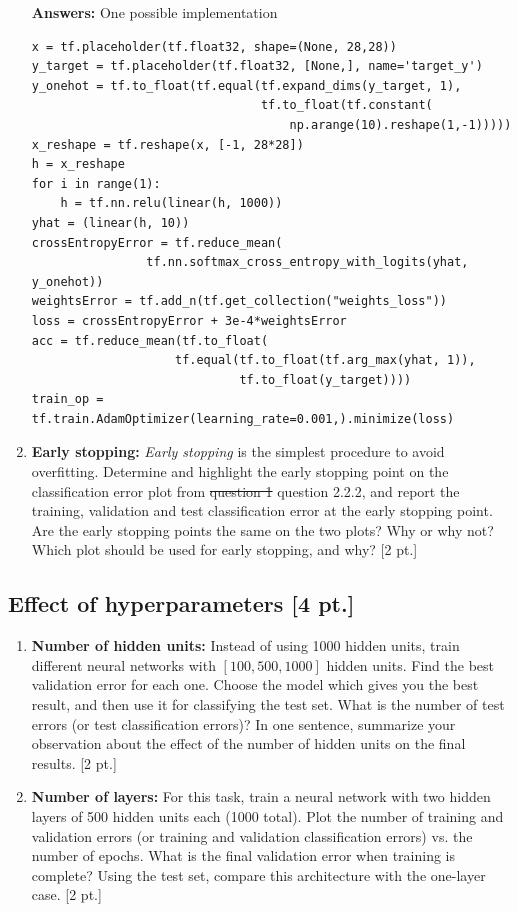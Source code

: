 \documentclass[12pt,letterpaper]{article}
\begin{document}
\begin{enumerate}
{\color{red}
  \textbf{Answers:}
  One possible implementation
}
\begin{verbatim}
x = tf.placeholder(tf.float32, shape=(None, 28,28))
y_target = tf.placeholder(tf.float32, [None,], name='target_y')
y_onehot = tf.to_float(tf.equal(tf.expand_dims(y_target, 1),
                                tf.to_float(tf.constant(
                                    np.arange(10).reshape(1,-1)))))
x_reshape = tf.reshape(x, [-1, 28*28])
h = x_reshape
for i in range(1):
    h = tf.nn.relu(linear(h, 1000))
yhat = (linear(h, 10))
crossEntropyError = tf.reduce_mean(
                tf.nn.softmax_cross_entropy_with_logits(yhat, y_onehot))
weightsError = tf.add_n(tf.get_collection("weights_loss"))
loss = crossEntropyError + 3e-4*weightsError
acc = tf.reduce_mean(tf.to_float(
                    tf.equal(tf.to_float(tf.arg_max(yhat, 1)), 
                             tf.to_float(y_target))))
train_op = tf.train.AdamOptimizer(learning_rate=0.001,).minimize(loss)
\end{verbatim}


  \item \textbf{Early stopping:} \textit{Early stopping} is the simplest procedure to avoid overfitting. Determine and highlight the early stopping point on the classification error plot from \st{question 1} {\color{red} question 2.2.2}, and report the training, validation and test classification error at the early stopping point. Are the early stopping points the same on the two plots? Why or why not? Which plot should be used for early stopping, and why? [2 pt.]
\end{enumerate}

\subsection{Effect of hyperparameters [4 pt.]}
\begin{enumerate}
   \item  \textbf{Number of hidden units:}
Instead of using 1000 hidden units, train different neural networks with $[100, 500, 1000]$ hidden units. Find the best validation error for each one. Choose the model which gives you the best result, and then use it for classifying the test set. What is the number of test errors {\color{red}(or test classification errors)}? In one sentence, summarize your observation about the effect of the number of hidden units on the final results. [2 pt.]

   \item  \textbf{Number of layers:}
     For this task, train a neural network with two hidden layers of 500 hidden units each (1000 total). Plot the number of training and validation errors {\color{red}(or training and validation classification errors)} vs. the number of epochs. What is the final validation error when training is complete? Using the test set, compare this architecture with the one-layer case. [2 pt.]
\end{enumerate}
\end{document}

